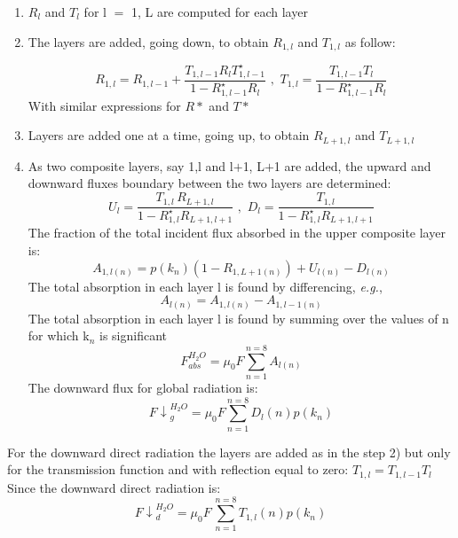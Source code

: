 \begin{enumerate}
\item $R_{l} $ and $T_{l}$ for l $=$ 1, L are computed for each layer
\item The layers are added, going down, to obtain $R_{1,l}$ and $T_{1,l}$ as follow:

\begin{equation}
R_{1,l}=R_{1,l-1}+\frac{T_{1,l-1}R_{l}T_{1,l-1}^{\star }}{1-R_{1,l-1}^{\star
}R_{l}}\, \, ,\, \, T_{1,l}=\frac{T_{1,l-1}T_{l}}{1-R_{1,l-1}^{\star }R_{l}}
\end{equation}
With similar expressions for $R*$ and $T*$
\item Layers are added one at a time, going up, to obtain $R_{L+1,l}$ and $T_{L+1,l}$
\item As two composite layers, say 1,l and l$+$1, L$+$1 are added, the upward and downward fluxes boundary between the two layers are determined:
\begin{equation}
U_{l}=\frac{T_{1,l}{\, R}_{L+1,l}}{1-R_{1,l}^{\star }R_{L+1,l+1}}\, \, ,\, \,
D_{l}=\frac{T_{1,l}}{1-R_{1,l}^{\star }R_{L+1,l+1}}
\end{equation}
The fraction of the total incident flux absorbed in the upper composite
layer is:
\begin{equation}
A_{1,l(n)}=p\left( k_{n} \right)\left( 1-R_{1,L+1(n)}
\right)+U_{l(n)}-D_{l(n)}
\end{equation}
The total absorption in each layer l is found by differencing, \emph{e.g.},
\begin{equation}
A_{l(n)}=A_{1,l(n)}-A_{1,l-1(n)}
\end{equation}
The total absorption in each layer l is found by summing over the values of
n for which k$_{n}$ is significant
\begin{equation}
F_{abs}^{H_{2}O}=\mu_{0}F\sum\limits_{n=1}^{n=8} A_{l(n)}
\end{equation}
The downward flux for global radiation is:
\begin{equation}
{F\downarrow }_{g}^{H_{2}O}=\mu_{0}F\sum\limits_{n=1}^{n=8} {D_{l}\left( n
\right)p\left( k_{n} \right)}
\end{equation}
\end{enumerate}
For the downward direct radiation the layers are added as in the step 2) but
only for the transmission function and with reflection equal to zero:
$T_{1,l}=T_{1,l-1}T_{l}$ Since the downward direct radiation is:
\begin{equation}
{F\downarrow }_{d}^{H_{2}O}=\mu_{0}F\, \sum\limits_{n=1}^{n=8} T_{1,l} \left(
n \right)p(k_{n})
\end{equation}

